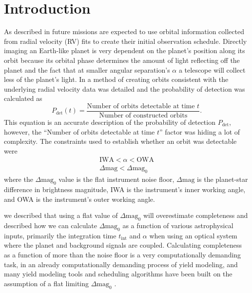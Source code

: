 \section{Introduction}
\label{sec:accurate_pdet_intro}

As described in  future missions are expected to use
orbital information collected from radial velocity (RV) fits to create their
initial observation schedule. Directly imaging an Earth-like planet is very
dependent on the planet's position along its orbit because its orbital phase
determines the amount of light reflecting off the planet and the fact that at
smaller angular separation's $\alpha$ a telescope will collect less of the planet's
light. In  a method of creating orbits consistent
with the underlying radial velocity data was detailed and the probability
of detection was calculated as
\begin{equation}
    P_{\textrm{det}}(t) = \frac{\textrm{Number of orbits detectable at time $t$}}{\textrm{Number of
    constructed orbits}}
.\end{equation}
This equation is an accurate description of the probability of detection
$P_\textrm{det}$, however, the ``Number of orbits detectable at time $t$'' factor
was hiding a lot of complexity. The constraints used to establish whether an orbit
was detectable were
\begin{align}
    \text{IWA} < \alpha < \text{OWA}\\
    \Delta\mathrm{mag} < \Delta\mathrm{mag}_0
\end{align}
where the $\Delta\textrm{mag}_0$ value is the flat instrument noise floor,
$\Delta\textrm{mag}$ is the planet-star difference in brightness magnitude, IWA
is the instrument's inner working angle, and OWA is the instrument's outer
working angle.

 we described that using a flat value of
$\Delta\textrm{mag}_0$ will overestimate completeness and described how we can
calculate $\Delta\textrm{mag}_0$ as a function of various astrophysical inputs,
primarily the integration time $t_\textrm{int}$ and $\alpha$ when using an
optical system where the planet and background signals are coupled. Calculating
completeness as a function of more than the noise floor is a very
computationally demanding task, in an already computationally demanding process
of yield modeling, and many yield modeling tools and scheduling algorithms have
been built on the assumption of a flat limiting $\Delta\textrm{mag}_0$
\citep{savranskyAnalyzingDesignsPlanetFinding2010,starkMaximizingExoEarthCandidate2014,
keithlyOptimalScheduling2020, garrettAnalyticalFormulation2016,
keithlyIntegrationTime2021, morganFasterExoEarth2021}.


